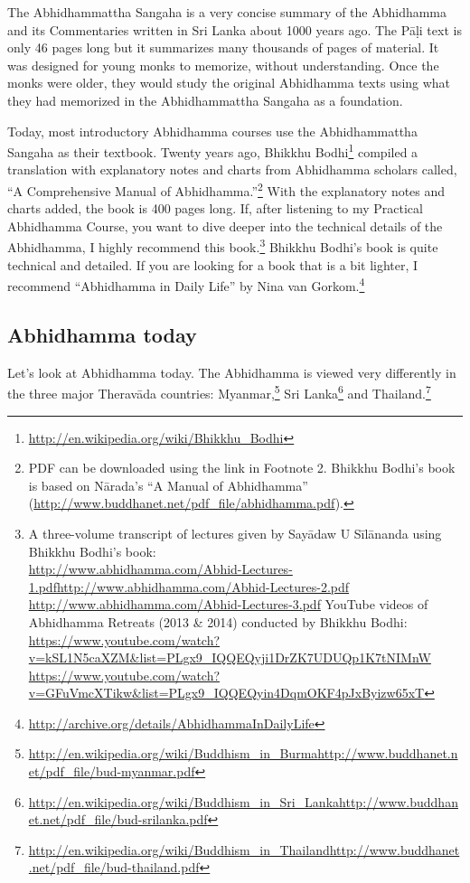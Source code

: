 The Abhidhammattha Sangaha is a very concise summary of the Abhidhamma and its Commentaries written in Sri Lanka about 1000 years ago. The Pāḷi text is only 46 pages long but it summarizes many thousands of pages of material. It was designed for young monks to memorize, without understanding. Once the monks were older, they would study the original Abhidhamma texts using what they had memorized in the Abhidhammattha Sangaha as a foundation. 

\pagebreak

Today, most introductory Abhidhamma courses use the Abhidhammattha Sangaha as their textbook. Twenty years ago, Bhikkhu Bodhi\footnote{\url{http://en.wikipedia.org/wiki/Bhikkhu_Bodhi}} compiled a translation with explanatory notes and charts from Abhidhamma scholars called, “A Comprehensive Manual of Abhidhamma.”\footnote{PDF can be downloaded using the link in Footnote 2. Bhikkhu Bodhi's book is based on Nārada's “A Manual of Abhidhamma” (\url{http://www.buddhanet.net/pdf_file/abhidhamma.pdf}).} With the explanatory notes and charts added, the book is 400 pages long. If, after listening to my Practical Abhidhamma Course, you want to dive deeper into the technical details of the Abhidhamma, I highly recommend this book.\footnote{A three-volume transcript of lectures given by Sayādaw U Sīlānanda using Bhikkhu Bodhi’s book:\\ \url{http://www.abhidhamma.com/Abhid-Lectures-1.pdf}\linebreak \url{http://www.abhidhamma.com/Abhid-Lectures-2.pdf} \linebreak \url{http://www.abhidhamma.com/Abhid-Lectures-3.pdf}\linebreak
YouTube videos of Abhidhamma Retreats (2013 \& 2014) conducted by Bhikkhu Bodhi:\\
\url{https://www.youtube.com/watch?v=kSL1N5caXZM&list=PLgx9_IQQEQyji1DrZK7UDUQp1K7tNIMnW}
\url{https://www.youtube.com/watch?v=GFuVmcXTikw&list=PLgx9_IQQEQyin4DqmOKF4pJxByizw65xT}} Bhikkhu Bodhi’s book is quite technical and detailed. If you are looking for a book that is a bit lighter, I recommend “Abhidhamma in Daily Life” by Nina van Gorkom.\footnote{\url{http://archive.org/details/AbhidhammaInDailyLife}}

\subsection*{Abhidhamma today}

Let’s look at Abhidhamma today. The Abhidhamma is viewed very differently in the three major Theravāda countries: Myanmar,\footnote{\url{http://en.wikipedia.org/wiki/Buddhism_in_Burma}\linebreak\url{http://www.buddhanet.net/pdf_file/bud-myanmar.pdf}} Sri Lanka\footnote{\url{http://en.wikipedia.org/wiki/Buddhism_in_Sri_Lanka}\linebreak\url{http://www.buddhanet.net/pdf_file/bud-srilanka.pdf}} and Thailand.\footnote{\url{http://en.wikipedia.org/wiki/Buddhism_in_Thailand}\linebreak\url{http://www.buddhanet.net/pdf_file/bud-thailand.pdf}}

